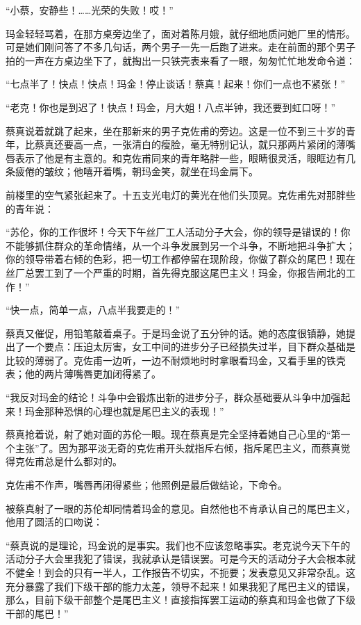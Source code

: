 \par “小蔡，安静些！……光荣的失败！哎！”
\par 玛金轻轻骂着，在那方桌旁边坐了，面对着陈月娥，就仔细地质问她厂里的情形。可是她们刚问答了不多几句话，两个男子一先一后跑了进来。走在前面的那个男子拍的一声在方桌边坐下了，就掏出一只铁壳表来看了一眼，匆匆忙忙地发命令道：
\par “七点半了！快点！快点！玛金！停止谈话！蔡真！起来！你们一点也不紧张！”
\par “老克！你也是到迟了！快点！玛金，月大姐！八点半钟，我还要到虹口呀！”
\par 蔡真说着就跳了起来，坐在那新来的男子克佐甫的旁边。这是一位不到三十岁的青年，比蔡真还要高一点，一张清白的瘦脸，毫无特别记认，就只那两片紧闭的薄嘴唇表示了他是有主意的。和克佐甫同来的青年略胖一些，眼睛很灵活，眼眶边有几条疲倦的皱纹；他嘻开着嘴，朝玛金笑，就坐在玛金肩下。
\par 前楼里的空气紧张起来了。十五支光电灯的黄光在他们头顶晃。克佐甫先对那胖些的青年说：
\par “苏伦，你的工作很坏！今天下午丝厂工人活动分子大会，你的领导是错误的！你不能够抓住群众的革命情绪，从一个斗争发展到另一个斗争，不断地把斗争扩大；你的领导带着右倾的色彩，把一切工作都停留在现阶段，你做了群众的尾巴！现在丝厂总罢工到了一个严重的时期，首先得克服这尾巴主义！玛金，你报告闸北的工作！”
\par “快一点，简单一点，八点半我要走的！”
\par 蔡真又催促，用铅笔敲着桌子。于是玛金说了五分钟的话。她的态度很镇静，她提出了一个要点：压迫太厉害，女工中间的进步分子已经损失过半，目下群众基础是比较的薄弱了。克佐甫一边听，一边不耐烦地时时拿眼看玛金，又看手里的铁壳表；他的两片薄嘴唇更加闭得紧了。
\par “我反对玛金的结论！斗争中会锻炼出新的进步分子，群众基础要从斗争中加强起来！玛金那种恐惧的心理也就是尾巴主义的表现！”
\par 蔡真抢着说，射了她对面的苏伦一眼。现在蔡真是完全坚持着她自己心里的“第一个主张”了。因为那平淡无奇的克佐甫开头就指斥右倾，指斥尾巴主义，而蔡真觉得克佐甫总是什么都对的。
\par 克佐甫不作声，嘴唇再闭得紧些；他照例是最后做结论，下命令。
\par 被蔡真射了一眼的苏伦却同情着玛金的意见。自然他也不肯承认自己的尾巴主义，他用了圆活的口吻说：
\par “蔡真说的是理论，玛金说的是事实。我们也不应该忽略事实。老克说今天下午的活动分子大会里我犯了错误，我就承认是错误罢。可是今天的活动分子大会根本就不健全！到会的只有一半人，工作报告不切实，不扼要；发表意见又非常杂乱。这充分暴露了我们下级干部的能力太差，领导不起来！如果我犯了尾巴主义的错误，那么，目前下级干部整个是尾巴主义！直接指挥罢工运动的蔡真和玛金也做了下级干部的尾巴！”
